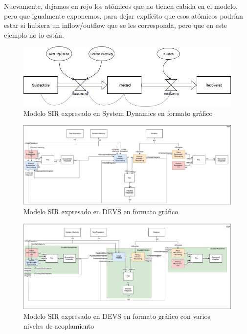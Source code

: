 Nuevamente, dejamos en rojo los atómicos que no tienen cabida en el modelo, pero que igualmente exponemos, para dejar explícito que esos atómicos podrían estar si hubiera un inflow/outflow que se les corresponda, pero que en este ejemplo no lo están.
\begin{figure}[!h]
\centering
\includegraphics[scale=0.5]{imagenes/SIR_sd.jpg}
\caption{Modelo SIR expresado en System Dynamics en formato gráfico}
\label{fig:SIR_sd}
\end{figure}
\begin{figure}[!h]
\centering
\includegraphics[scale=0.3]{imagenes/SIR_devs_flattened.jpg}
\caption{Modelo SIR expresado en DEVS en formato gráfico}
\label{fig:SIR_devs_flattened}
\end{figure}
\begin{figure}[!h]
\centering
\includegraphics[scale=0.3]{imagenes/SIR_devs.jpg}
\caption{Modelo SIR expresado en DEVS en formato gráfico con varios niveles de acoplamiento}
\label{fig:SIR_devs}
\end{figure}
